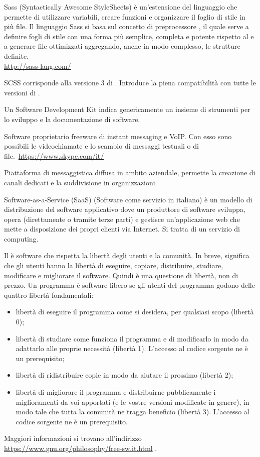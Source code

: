 Sass (Syntactically Awesome StyleSheets) è un'estensione del linguaggio  che permette di utilizzare variabili, creare funzioni e organizzare il foglio di stile in più file. Il linguaggio Sass si basa sul concetto di preprocessore , il quale serve a definire fogli di stile con una forma più semplice, completa e potente rispetto al  e a generare file  ottimizzati aggregando, anche in modo complesso, le strutture definite.\\
\url{http://sass-lang.com/}

SCSS corrisponde alla versione 3 di . Introduce la piena compatibilità con tutte le versioni di .

Un Software Development Kit indica genericamente un insieme di strumenti per lo sviluppo e la documentazione di software.

Software proprietario freeware di instant messaging e VoIP. Con esso sono possibili le videochiamate e lo scambio di messaggi testuali o di file.\
\url{https://www.skype.com/it/}

Piattaforma di messaggistica diffusa in ambito aziendale, permette la creazione di canali dedicati e la suddivisione in organizzazioni. 

Software-as-a-Service (SaaS) (Software come servizio in italiano) è un modello di distribuzione del software applicativo dove un produttore di software sviluppa, opera (direttamente o tramite terze parti) e gestisce un'applicazione web che mette a disposizione dei propri clienti via Internet. Si tratta di un servizio di  computing.

Il  è software che rispetta la libertà degli utenti e la comunità. In breve, significa che gli utenti hanno la libertà di eseguire, copiare, distribuire, studiare, modificare e migliorare il software. Quindi è una questione di libertà, non di prezzo.
Un programma è software libero se gli utenti del programma godono delle quattro libertà fondamentali:
\begin{itemize}
    \item libertà di eseguire il programma come si desidera, per qualsiasi scopo (libertà 0);
    \item libertà di studiare come funziona il programma e di modificarlo in modo da adattarlo alle proprie necessità (libertà 1). L'accesso al codice sorgente ne è un prerequisito;
    \item libertà di ridistribuire copie in modo da aiutare il prossimo (libertà 2);
    \item libertà di migliorare il programma e distribuirne pubblicamente i miglioramenti da voi apportati (e le vostre versioni modificate in genere), in modo tale che tutta la comunità ne tragga beneficio (libertà 3). L'accesso al codice sorgente ne è un prerequisito.
\end{itemize}
Maggiori informazioni si trovano all'indirizzo \url{https://www.gnu.org/philosophy/free-sw.it.html} .

